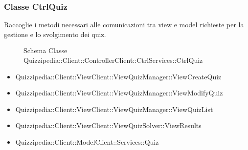 \subsubsection{Classe CtrlQuiz}
Raccoglie i metodi necessari alle comunicazioni tra view e model richieste per la gestione e lo svolgimento dei quiz.
\begin{figure}[H]
\centering
\noindent{}
\caption[Schema Classe CtrlQuiz]{Schema Classe Quizzipedia::Client::ControllerClient::CtrlServices::CtrlQuiz}
\end{figure}
\begin{itemize}
\item Quizzipedia::Client::ViewClient::ViewQuizManager::ViewCreateQuiz
\item Quizzipedia::Client::ViewClient::ViewQuizManager::ViewModifyQuiz
\item Quizzipedia::Client::ViewClient::ViewQuizManager::ViewQuizList
\item Quizzipedia::Client::ViewClient::ViewQuizSolver::ViewResults
\end{itemize}
\begin{itemize}
\item Quizzipedia::Client::ModelClient::Services::Quiz
\end{itemize}
